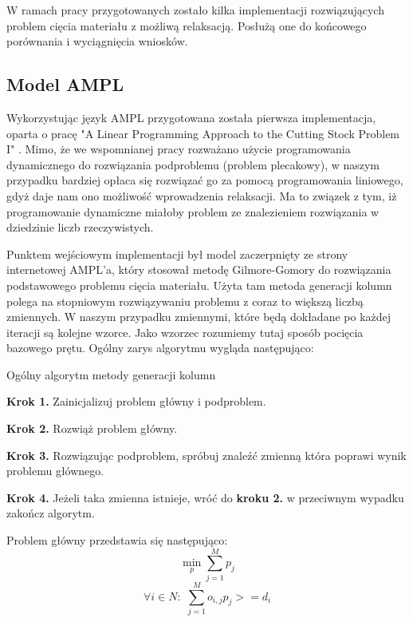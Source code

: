 W ramach pracy przygotowanych zostało kilka implementacji rozwiązujących problem cięcia materiału z możliwą relaksacją. Posłużą one do końcowego porównania i wyciągnięcia wniosków.

\subsection{Model AMPL}
Wykorzystując język AMPL przygotowana została pierwsza implementacja, oparta o pracę "A Linear Programming Approach to the Cutting Stock Problem I" \cite{linear-programming-gilmore}. Mimo, że we wspomnianej pracy rozważano użycie programowania dynamicznego do rozwiązania podproblemu (problem plecakowy), w naszym przypadku bardziej opłaca się rozwiązać go za pomocą programowania liniowego, gdyż daje nam ono możliwość wprowadzenia relaksacji. Ma to związek z tym, iż programowanie dynamiczne miałoby problem ze znalezieniem rozwiązania w dziedzinie liczb rzeczywistych. 

Punktem wejściowym implementacji był model zaczerpnięty ze strony internetowej AMPL'a, który stosował metodę Gilmore-Gomory do rozwiązania podstawowego problemu cięcia materiału. Użyta  tam metoda generacji kolumn polega na stopniowym rozwiązywaniu problemu z coraz to większą liczbą zmiennych. W naszym przypadku zmiennymi, które będą dokładane po każdej iteracji są kolejne wzorce. Jako wzorzec rozumiemy tutaj sposób pocięcia bazowego prętu. Ogólny zarys algorytmu wygląda następująco:
\begin{algorithm}[!t]
\raggedright
\caption{Ogólny algorytm metody generacji kolumn}
\label{alg1}
\textbf{Krok 1.} Zainicjalizuj problem główny i podproblem.
\smallskip

\textbf{Krok 2.} Rozwiąż problem główny.
\smallskip

\textbf{Krok 3.} Rozwiązując podproblem, spróbuj znaleźć zmienną która poprawi wynik problemu głównego.
\smallskip

\textbf{Krok 4.} Jeżeli taka zmienna istnieje, wróć do \textbf{kroku 2.} w przeciwnym wypadku zakończ algorytm.
\end{algorithm}

Problem główny przedstawia się następująco:
\begin{equation}
    \min_p \sum_{j=1}^{M} p_j
\end{equation}
\begin{equation}
    \forall{i} \! \in \! N\!: \,\, \sum_{j=1}^{M} o_{i,j} p_j >= d_i
\end{equation}

